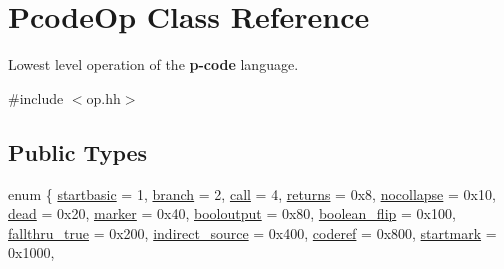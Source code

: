 \hypertarget{class_pcode_op}{}\section{Pcode\+Op Class Reference}
\label{class_pcode_op}


Lowest level operation of the {\bfseries{p-\/code}} language.  




{\ttfamily \#include $<$op.\+hh$>$}

\subsection*{Public Types}
\begin{DoxyCompactItemize}
\item 
enum \{ \newline
\mbox{\hyperlink{class_pcode_op_ad8230d20e6cd3905b8ec0bb6652eb91fa87fc6777cadc38baf72c41c402042974}{startbasic}} = 1, 
\mbox{\hyperlink{class_pcode_op_ad8230d20e6cd3905b8ec0bb6652eb91fa56e733c39533b883d302886d86303b91}{branch}} = 2, 
\mbox{\hyperlink{class_pcode_op_ad8230d20e6cd3905b8ec0bb6652eb91faa27231d912a89ac1285a36659ed45a90}{call}} = 4, 
\mbox{\hyperlink{class_pcode_op_ad8230d20e6cd3905b8ec0bb6652eb91facf056ad5a0fb78ce8017ac9d8f17dbef}{returns}} = 0x8, 
\newline
\mbox{\hyperlink{class_pcode_op_ad8230d20e6cd3905b8ec0bb6652eb91fa5057de67535051aec91b674a773da7af}{nocollapse}} = 0x10, 
\mbox{\hyperlink{class_pcode_op_ad8230d20e6cd3905b8ec0bb6652eb91fa770025b4d1bd9ec43ed8368c9288c2e0}{dead}} = 0x20, 
\mbox{\hyperlink{class_pcode_op_ad8230d20e6cd3905b8ec0bb6652eb91fa780a9849774b1edf8a82e8ee0bf1c221}{marker}} = 0x40, 
\mbox{\hyperlink{class_pcode_op_ad8230d20e6cd3905b8ec0bb6652eb91fab251f6a460ea44aa0eaa3a0a4531e83a}{booloutput}} = 0x80, 
\newline
\mbox{\hyperlink{class_pcode_op_ad8230d20e6cd3905b8ec0bb6652eb91fa099ba4fbb06f9d5e2c09f320880b0c6d}{boolean\+\_\+flip}} = 0x100, 
\mbox{\hyperlink{class_pcode_op_ad8230d20e6cd3905b8ec0bb6652eb91fa0fd2668a2070aa584d427656c4af08d1}{fallthru\+\_\+true}} = 0x200, 
\mbox{\hyperlink{class_pcode_op_ad8230d20e6cd3905b8ec0bb6652eb91fa71ea7f0824b56b07da7f77e8f09b9224}{indirect\+\_\+source}} = 0x400, 
\mbox{\hyperlink{class_pcode_op_ad8230d20e6cd3905b8ec0bb6652eb91fadf4066945c812c3e20e150b6fbfce5ee}{coderef}} = 0x800, 
\newline
\mbox{\hyperlink{class_pcode_op_ad8230d20e6cd3905b8ec0bb6652eb91fa64f1f43673312ffd240147a69006cebf}{startmark}} = 0x1000, 

\end{DoxyCompactItemize}
